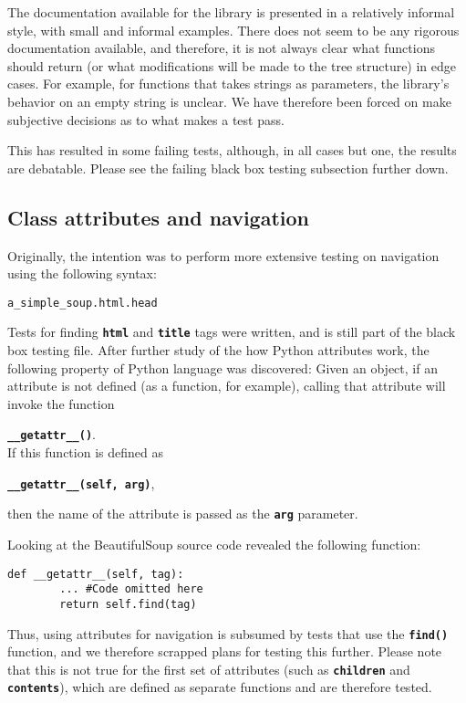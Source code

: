 \documentclass[10pt]{article}
\newcommand{\tbt}[1]{\texttt{\textbf{#1}}}
\begin{document}
The documentation available for the library is presented in a relatively informal style, with small and informal examples. There does not seem to be any rigorous documentation available, and therefore, it is not always clear what functions should return (or what modifications will be made to the tree structure) in edge cases. For example, for functions that takes strings as parameters, the library's behavior on an empty string is unclear. We have therefore been forced on make subjective decisions as to what makes a test pass. 

This has resulted in some failing tests, although, in all cases but one, the results are debatable. Please see the failing black box testing subsection further down.

\subsection{Class attributes and navigation}

Originally, the intention was to perform more extensive testing on navigation using the following syntax:
\begin{lstlisting}[style = pythonstyle]
a_simple_soup.html.head
\end{lstlisting}
Tests for finding \tbt{html} and \tbt{title} tags were written, and is still part of the black box testing file. After further study of the how Python attributes work, the following property of Python language was discovered: Given an object, if an attribute is not defined (as a function, for example), calling that attribute will invoke the function 

\tbt{\_\_getattr\_\_()}. \\

If this function is defined as 

\tbt{\_\_getattr\_\_(self, arg)}, 

then the name of the attribute is passed as the \tbt{arg} parameter.

Looking at the BeautifulSoup source code revealed the following function:
\begin{lstlisting}[style=pythonstyle]
  def __getattr__(self, tag):
        ... #Code omitted here
        return self.find(tag)
\end{lstlisting}

Thus, using attributes for navigation is subsumed by tests that use the \tbt{find()} function, and we therefore scrapped plans for testing this further. Please note that this is not true for the first set of attributes (such as \tbt{children} and \tbt{contents}), which are defined as separate functions and are therefore tested.
\end{document}

